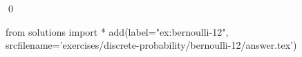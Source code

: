 
\begin{ex} 
  \label{ex:bernoulli-12}
  
  \qed
\end{ex} 
\begin{python0}
from solutions import *
add(label="ex:bernoulli-12",
    srcfilename='exercises/discrete-probability/bernoulli-12/answer.tex') 
\end{python0}
